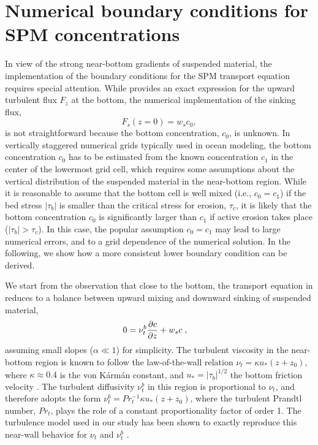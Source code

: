 \chapter{Numerical boundary conditions for SPM concentrations}


In view of the strong near-bottom gradients of suspended material, the
implementation of the boundary conditions for the SPM transport
equation  requires special attention. While  provides
an exact expression for the upward turbulent flux $F_z$ at the bottom,
the numerical implementation of the sinking flux,
\begin{equation}
 \label{Fs}
 F_s(z=0) = w_s c_0 \comma
\end{equation}
is not straightforward because the bottom concentration, $c_0$, is
unknown. In vertically staggered numerical grids typically used in
ocean modeling, the bottom concentration $c_0$ has to be estimated
from the known concentration $c_1$ in the center of the lowermost grid
cell, which requires some assumptions about the vertical distribution
of the suspended material in the near-bottom region. While it is
reasonable to assume that the bottom cell is well mixed (i.e.,
$c_0=c_1$) if the bed stress $|\tau_b|$ is smaller than the critical
stress for erosion, $\tau_c$, it is likely that the bottom
concentration $c_0$ is significantly larger than $c_1$ if active
erosion takes place ($|\tau_b| > \tau_c$). In this case, the popular
assumption $c_0=c_1$ may lead to large numerical errors, and to a grid
dependence of the numerical solution. In the following, we show how a
more consistent lower boundary condition can be derived.

We start from the observation that close to the bottom, the transport
equation in  reduces to a balance between upward mixing and
downward sinking of suspended material,
\begin{equation}
 \label{cstationary}
 0 = \nu_t^b \dfrac{\partial {c}}{\partial {z}} + w_s c
 \; , \quad
\end{equation}
assuming small slopes ($\alpha \ll 1$) for simplicity. The turbulent
viscosity in the near-bottom region is known to follow the
law-of-the-wall relation $\nu_t = \kappa u_\ast (z + z_0)$, where
$\kappa \approx 0.4$ is the von K{\'a}rm{\'a}n constant, and $u_\ast =
|\tau_b|^{1/2}$ the bottom friction velocity
\citep[e.g.,][]{Pope2000a}. The turbulent diffusivity $\nu_t^b$ in this
region is proportional to $\nu_t$, and therefore adopts the form
$\nu_t^b = Pr_t^{-1} \kappa u_\ast (z + z_0)$, where the turbulent
Prandtl number, $Pr_t$, plays the role of a constant proportionality
factor of order 1. The turbulence model used in our study has been shown to
exactly reproduce this near-wall behavior for $\nu_t$ and $\nu_t^b$
\citep[e.g., ][]{UmlaufBurchard2003a,UmlaufBurchard2005a}.

